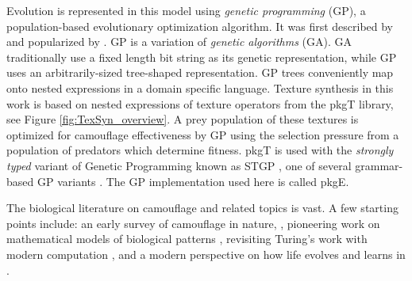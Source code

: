 \documentclass[acmtog]{acmart}
\newcommand{\jargon}[1]{\textit{#1}}
\newcommand{\texsyn}[0]{pkgT}
\newcommand{\lazypredator}[0]{pkgE}
\begin{document}
\par
Evolution is represented in this model using \jargon{genetic programming} (GP), a population-based evolutionary optimization algorithm. It was first described by \citet{cramer_representation_1985} and popularized by \citet{koza_genetic_1992}. GP is a variation of \jargon{genetic algorithms} (GA). GA traditionally use a fixed length bit string as its genetic representation, while GP uses an arbitrarily-sized tree-shaped representation. GP trees conveniently map onto nested expressions in a domain specific language. Texture synthesis in this work is based on nested expressions of texture operators from the \texsyn{} library, see Figure \ref{fig:TexSyn_overview}. A prey population of these textures is optimized for camouflage effectiveness by GP using the selection pressure from a population of predators which determine fitness. \texsyn{} is used with the \jargon{strongly typed} variant of Genetic Programming known as STGP \cite{montana_strongly_1995}, one of several grammar-based GP variants \cite{Mckay_2010}. The GP implementation used here is called \lazypredator{}.
\par
The biological literature on camouflage and related topics is vast. A few starting points include: an early survey of camouflage in nature, \citet{thayer_concealing-coloration_1909}, pioneering work on mathematical models of biological patterns \citet{turing_chemical_1952}, revisiting Turing's work with modern computation \citet{murray_how_1988}, and a modern perspective on how life evolves and learns in \citet{valiant_probably_2013}.
\par

\end{document}
